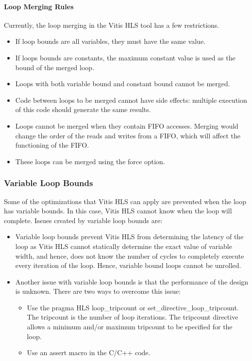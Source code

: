 \paragraph{Loop Merging Rules}

Currently, the loop merging in the Vitis HLS tool has a few restrictions.
\begin{itemize}
  \item If loop bounds are all variables, they must have the same value.
  \item If loops bounds are constants, the maximum constant value is used as the bound of the merged loop.
  \item Loops with both variable bound and constant bound cannot be merged.
  \item Code between loops to be merged cannot have side effects: multiple execution of this code should generate the same results.
  \item Loops cannot be merged when they contain FIFO accesses. Merging would change the order of the reads and writes from a FIFO, which will affect the functioning of the FIFO.
  \item These loops can be merged using the force option.
\end{itemize}

\subsubsection{Variable Loop Bounds}
Some of the optimizations that Vitis HLS can apply are prevented when the loop has variable bounds. In this case, Vitis HLS cannot know when the loop will complete. Issues created by variable loop bounds are:

\begin{itemize}
  \item Variable loop bounds prevent Vitis HLS from determining the latency of the loop as Vitis HLS cannot statically determine the exact value of variable width, and hence, does not know the number of cycles to completely execute every iteration of the loop. Hence, variable bound loops cannot be unrolled.
  \item Another issue with variable loop bounds is that the performance of the design is unknown. There are two ways to overcome this issue: \begin{itemize}
    \item Use the pragma HLS loop\_tripcount or set\_directive\_loop\_tripcount. The tripcount is the number of loop iterations. The tripcount directive allows a minimum and/or maximum tripcount to be specified for the loop. 
    \item Use an assert macro in the C/C++ code.
  \end{itemize}  
\end{itemize}

